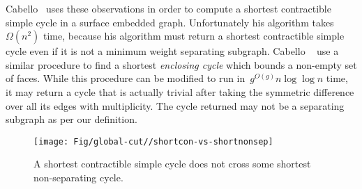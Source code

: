 Cabello~\cite{c-fscss-10} uses these observations in order to compute a shortest contractible simple cycle in a surface embedded graph.
Unfortunately his algorithm takes~$\Omega(n^2)$ time, because his algorithm must return a shortest contractible simple cycle even if it is not a minimum weight separating subgraph.
Cabello \etal~\cite{cdem-fotc-10} use a similar procedure to find a shortest \emph{enclosing cycle} which bounds a non-empty set of faces.
While this procedure can be modified to run in~$g^{O(g)} n \log \log n$ time, it may return a cycle that is actually trivial after taking the symmetric difference over all its edges with multiplicity.
The cycle returned may not be a separating subgraph as per our definition.

\begin{figure}[t]
\centering
\texttt{[image: Fig/global-cut//shortcon-vs-shortnonsep]}
\caption{A shortest contractible simple cycle does not cross some shortest non-separating cycle.}
\label{fig:global-cut_shortcon-vs-shortnonsep}
\end{figure}


\def\Gsnip{\mathord{G_{\subsnip}}}
\def\Sigmasnip{\mathord{\Sigma_{\subsnip}}}
\def\gammasnip{\mathord{\gamma_{\subsnip}}}


